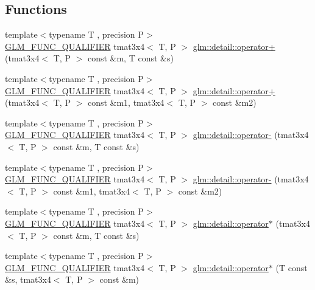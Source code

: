 \subsection*{Functions}
\begin{DoxyCompactItemize}
\item 
{\footnotesize template$<$typename T , precision P$>$ }\\\hyperlink{setup_8hpp_a33fdea6f91c5f834105f7415e2a64407}{G\+L\+M\+\_\+\+F\+U\+N\+C\+\_\+\+Q\+U\+A\+L\+I\+F\+I\+ER} tmat3x4$<$ T, P $>$ \hyperlink{namespaceglm_1_1detail_a7c6b25342faf6ccbcbf4bf4e4f0fecdb}{glm\+::detail\+::operator+} (tmat3x4$<$ T, P $>$ const \&m, T const \&s)
\item 
{\footnotesize template$<$typename T , precision P$>$ }\\\hyperlink{setup_8hpp_a33fdea6f91c5f834105f7415e2a64407}{G\+L\+M\+\_\+\+F\+U\+N\+C\+\_\+\+Q\+U\+A\+L\+I\+F\+I\+ER} tmat3x4$<$ T, P $>$ \hyperlink{namespaceglm_1_1detail_af899b04f52773d6cb1c094a9f0abf7d2}{glm\+::detail\+::operator+} (tmat3x4$<$ T, P $>$ const \&m1, tmat3x4$<$ T, P $>$ const \&m2)
\item 
{\footnotesize template$<$typename T , precision P$>$ }\\\hyperlink{setup_8hpp_a33fdea6f91c5f834105f7415e2a64407}{G\+L\+M\+\_\+\+F\+U\+N\+C\+\_\+\+Q\+U\+A\+L\+I\+F\+I\+ER} tmat3x4$<$ T, P $>$ \hyperlink{namespaceglm_1_1detail_ac9ad7c553d11668bd927b2a51f2b8c62}{glm\+::detail\+::operator-\/} (tmat3x4$<$ T, P $>$ const \&m, T const \&s)
\item 
{\footnotesize template$<$typename T , precision P$>$ }\\\hyperlink{setup_8hpp_a33fdea6f91c5f834105f7415e2a64407}{G\+L\+M\+\_\+\+F\+U\+N\+C\+\_\+\+Q\+U\+A\+L\+I\+F\+I\+ER} tmat3x4$<$ T, P $>$ \hyperlink{namespaceglm_1_1detail_a3fd8e3655e3c3346610a925262dc8a57}{glm\+::detail\+::operator-\/} (tmat3x4$<$ T, P $>$ const \&m1, tmat3x4$<$ T, P $>$ const \&m2)
\item 
{\footnotesize template$<$typename T , precision P$>$ }\\\hyperlink{setup_8hpp_a33fdea6f91c5f834105f7415e2a64407}{G\+L\+M\+\_\+\+F\+U\+N\+C\+\_\+\+Q\+U\+A\+L\+I\+F\+I\+ER} tmat3x4$<$ T, P $>$ \hyperlink{namespaceglm_1_1detail_a591d123661610d865ea7cd29d374e6f2}{glm\+::detail\+::operator$\ast$} (tmat3x4$<$ T, P $>$ const \&m, T const \&s)
\item 
{\footnotesize template$<$typename T , precision P$>$ }\\\hyperlink{setup_8hpp_a33fdea6f91c5f834105f7415e2a64407}{G\+L\+M\+\_\+\+F\+U\+N\+C\+\_\+\+Q\+U\+A\+L\+I\+F\+I\+ER} tmat3x4$<$ T, P $>$ \hyperlink{namespaceglm_1_1detail_a8f3969f33be28fe4f1d78b802cf3f63b}{glm\+::detail\+::operator$\ast$} (T const \&s, tmat3x4$<$ T, P $>$ const \&m)

\end{DoxyCompactItemize}
